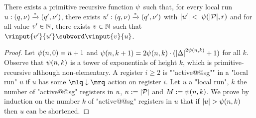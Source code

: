 \begin{lemma}
\label{lem:towerbound_signature}
There exists a primitive recursive function $\psi$ such that, for every local run $u: (q,\nu) \xrightarrow{*} (q', \nu')$, there exists $u' : (q,\nu) \xrightarrow{*} (q',\nu')$ with $|u'| <~\psi(|\mathcal{P}|,r)$ and for all value $v' \in \mathbb{N}$, there exists $v \in \mathbb{N}$ such that  $\vinput{v'}{u'} \subword \vinput{v}{u}$. 
\end{lemma}
\begin{proof}
Let $\psi(n,0) = n+1$ and $\psi(n,k+1) = 2 \psi(n,k) \cdot ({|\Delta|}^{2\psi(n,k)}+1)$ for all $k$. Observe that $\psi(n,k)$ is a tower of exponentials of height $k$, which is primitive-recursive although non-elementary. A register $i \geq 2$ is ""active@@sg"" in a "local run" $u$ if $u$ has some $\quotemarks{\enregact}$ action on register $i$. Let $u$ a "local run", $k$ the number of "active@@sg" registers in $u$, $n := |\mathcal{P}|$ and $M := \psi(n,k)$.
We prove by induction on the number $k$ of "active@@sg" registers in $u$  that if $|u| >\psi(n,k)$ then $u$ can be shortened. 
 


\end{proof}
